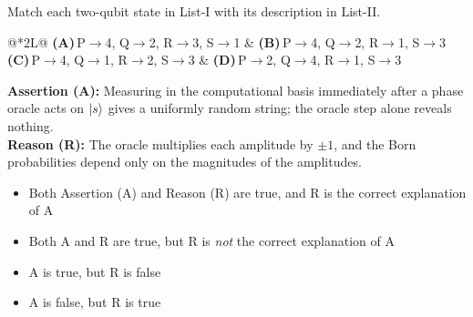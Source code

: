 \documentclass[11pt,a4paper]{article}
\newcommand{\optlabel}[1]{\textbf{(#1)}}
\newenvironment{qitem}[1]{\begin{list}{}{\setlength{\leftmargin}{3.3em}\setlength{\labelwidth}{3.1em}%
  \setlength{\labelsep}{0.2em}\setlength{\topsep}{3pt}\setlength{\parsep}{3pt}}\item[\textbf{Q.#1}\hfill]}{\end{list}}
\newcommand{\qsep}{\par\vspace{2pt}{\color{black!15}\hrule}\vspace{4pt}}
\begin{document}
\begin{qitem}{36}
Match each two-qubit state in List-I with its description in List-II.
\par\smallskip{}
\par\smallskip\noindent\begin{tabularx}{\linewidth}{@{}*{2}{L}@{}}
\optlabel{A}\,P$\to$4, Q$\to$2, R$\to$3, S$\to$1 & \optlabel{B}\,P$\to$4, Q$\to$2, R$\to$1, S$\to$3 \\[3pt]
\optlabel{C}\,P$\to$4, Q$\to$1, R$\to$2, S$\to$3 & \optlabel{D}\,P$\to$2, Q$\to$4, R$\to$1, S$\to$3
\end{tabularx}
\end{qitem}
\qsep

\begin{qitem}{37}
\textbf{Assertion (A):} Measuring in the computational basis immediately after a phase oracle acts on $\ket{s}$ gives a uniformly random string; the oracle step alone reveals nothing.\\[1mm]
\textbf{Reason (R):} The oracle multiplies each amplitude by $\pm1$, and the Born probabilities depend only on the magnitudes of the amplitudes.
\begin{itemize}[leftmargin=2.6em, labelsep=0.4em, itemsep=2pt, topsep=3pt]
\item[\optlabel{A}] Both Assertion (A) and Reason (R) are true, and R is the correct explanation of A
\item[\optlabel{B}] Both A and R are true, but R is \emph{not} the correct explanation of A
\item[\optlabel{C}] A is true, but R is false
\item[\optlabel{D}] A is false, but R is true
\end{itemize}
\end{qitem}
\qsep
\end{document}
